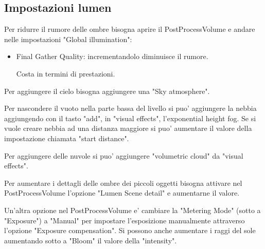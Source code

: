         \subsection{Impostazioni lumen}

            Per ridurre il rumore delle ombre bisogna aprire il PostProcessVolume e andare nelle impostazioni "Global illumination":
            \begin{itemize}
                \item Final Gather Quality: incrementandolo diminuisce il rumore.

                    \begin{notebox}
                        Costa in termini di prestazioni.
                    \end{notebox}
            \end{itemize}

            Per aggiungere il cielo bisogna aggiungere una "Sky atmosphere".

            Per nascondere il vuoto nella parte bassa del livello si puo' aggiungere la nebbia aggiungendo con il tasto "add", in "visual effects", l'exponential height fog.
            Se si vuole creare nebbia ad una distanza maggiore si puo' aumentare il valore della impostazione chiamata "start distance".

            Per aggiungere delle nuvole si puo' aggiungere "volumetric cloud" da "visual effects".

            Per aumentare i dettagli delle ombre dei piccoli oggetti bisogna attivare nel PostProcessVolume l'opzione "Lumen Scene detail" e aumentarne il valore.

            Un'altra opzione nel PostProcessVolume e' cambiare la "Metering Mode" (sotto a "Exposure") a "Manual" per impostare l'esposizione manualmente attraverso l'opzione "Exposure compensation".
            Si possono anche aumentare i raggi del sole aumentando sotto a "Bloom" il valore della "intensity".
